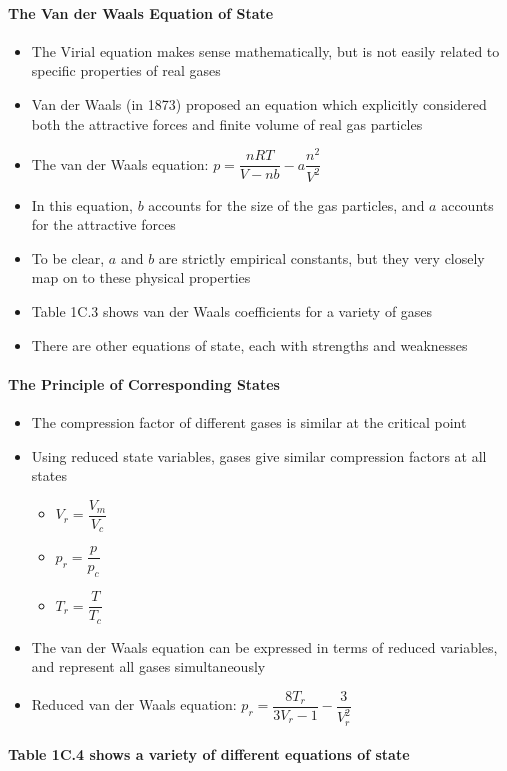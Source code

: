 \documentclass[12pt, openany, letterpaper]{memoir}
\begin{document}
\paragraph{The Van der Waals Equation of State}
\begin{itemize}
	\item The Virial equation makes sense mathematically, but is not easily related to specific properties of real gases
	\item Van der Waals (in 1873) proposed an equation which explicitly considered both the attractive forces and finite volume of real gas particles
	\item The van der Waals equation: $p=\dfrac{nRT}{V-nb}-a\dfrac{n^2}{V^2}$
	\item In this equation, $b$ accounts for the size of the gas particles, and $a$ accounts for the attractive forces
	\item To be clear, $a$ and $b$ are strictly empirical constants, but they very closely map on to these physical properties
	\item Table 1C.3 shows van der Waals coefficients for a variety of gases
	\item There are other equations of state, each with strengths and weaknesses
\end{itemize}
\paragraph{The Principle of Corresponding States}
\begin{itemize}
	\item The compression factor of different gases is similar at the critical point
	\item Using reduced state variables, gases give similar compression factors at all states
	      \begin{itemize}
		      \item $V_r = \dfrac{V_m}{V_c}$
		      \item $p_r=\dfrac{p}{p_c}$
		      \item $T_r=\dfrac{T}{T_c}$
	      \end{itemize}
	\item The van der Waals equation can be expressed in terms of reduced variables, and represent all gases simultaneously
	\item Reduced van der Waals equation: $p_r = \dfrac{8T_r}{3V_r-1}-\dfrac{3}{V_r^2}$
\end{itemize}
\paragraph{Table 1C.4 shows a variety of different equations of state}
\end{document}
